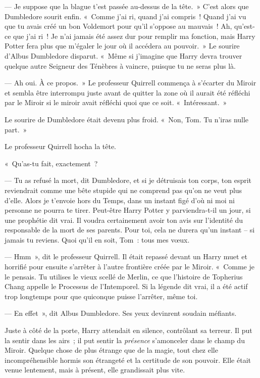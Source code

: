 --- Je suppose que la blague t'est passée au-dessus de la tête.~»
C'est alors que Dumbledore sourit enfin.
«~Comme j'ai ri, quand j'ai compris~!
Quand j'ai vu que tu avais créé un bon Voldemort pour qu'il s'oppose au mauvais~!
Ah, qu'est-ce que j'ai ri~!
Je n'ai jamais été assez dur pour remplir ma fonction, mais Harry Potter fera plus que m'égaler le jour où il accédera au pouvoir.~»
Le sourire d'Albus Dumbledore disparut.
«~Même si j'imagine que Harry devra trouver quelque autre Seigneur des Ténèbres à vaincre, puisque tu ne seras plus là.

--- Ah oui.
À ce propos.~»
Le professeur Quirrell commença à s'écarter du Miroir et sembla être interrompu juste avant de quitter la zone où il aurait été réfléchi par le Miroir si le miroir avait réfléchi quoi que ce soit.
«~Intéressant.~»

Le sourire de Dumbledore était devenu plus froid.
«~Non, Tom.
Tu n'iras nulle part.~»

Le professeur Quirrell hocha la tête.

«~Qu'as-tu fait, exactement~?

--- Tu as refusé la mort, dit Dumbledore, et si je détruisais ton corps, ton esprit reviendrait comme une bête stupide qui ne comprend pas qu'on ne veut plus d'elle.
Alors je t'envoie hors du Temps, dans un instant figé d'où ni moi ni personne ne pourra te tirer.
Peut-être Harry Potter y parviendra-t-il un jour, si une prophétie dit vrai.
Il voudra certainement avoir ton avis sur l'identité du responsable de la mort de ses parents.
Pour toi, cela ne durera qu'un instant -- si jamais tu reviens.
Quoi qu'il en soit, Tom~: tous mes vœux.

--- Hmm~», dit le professeur Quirrell.
Il était repassé devant un Harry muet et horrifié pour ensuite s'arrêter à l'autre frontière créée par le Miroir.
«~Comme je le pensais.
Tu utilises le vieux scellé de Merlin, ce que l'histoire de Topherius Chang appelle le Processus de l'Intemporel.
Si la légende dit vrai, il a été actif trop longtemps pour que quiconque puisse l'arrêter, même toi.

--- En effet~», dit Albus Dumbledore.
Ses yeux devinrent soudain méfiants.

Juste à côté de la porte, Harry attendait en silence, contrôlant sa terreur.
Il put la sentir dans les airs~; il put sentir la \emph{présence} s'amonceler dans le champ du Miroir.
Quelque chose de plus étrange que de la magie, tout chez elle incompréhensible hormis son étrangeté et la certitude de son pouvoir.
Elle était venue lentement, mais à présent, elle grandissait plus vite.


